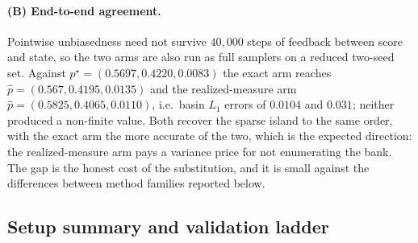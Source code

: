 \documentclass[11pt]{article}
\begin{document}
\paragraph{(B) End-to-end agreement.}
Pointwise unbiasedness need not survive $40{,}000$ steps of feedback between
score and state, so the two arms are also run as full samplers on a reduced
two-seed set.  Against $p^\star=(0.5697,0.4220,0.0083)$ the exact arm reaches
$\widehat p=(0.567,0.4195,0.0135)$ and the realized-measure arm
$\widehat p=(0.5825,0.4065,0.0110)$, i.e.\ basin $L_1$ errors of $0.0104$ and
$0.031$; neither produced a non-finite value.  Both recover the sparse island to
the same order, with the exact arm the more accurate of the two, which is the
expected direction: the realized-measure arm pays a variance price for not
enumerating the bank.  The gap is the honest cost of the substitution, and it is
small against the differences between method families reported below.

\subsection{Setup summary and validation ladder}
\label{app:e5-setup}
\end{document}
